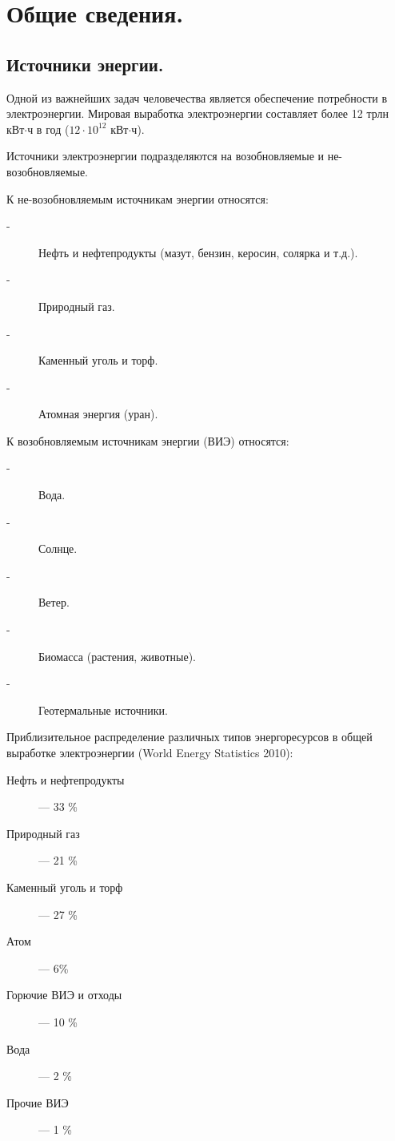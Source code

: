 \newtheorem{primer}{Пример}

\section {Общие сведения.}			%

\subsection {Источники энергии.}

Одной из важнейших задач человечества является обеспечение потребности в электроэнергии. Мировая выработка электроэнергии составляет более 12 трлн кВт$\cdot$ч в год ($12 \cdot 10^{12}$ кВт$\cdot$ч).

Источники электроэнергии подразделяются на возобновляемые и не-возобновляемые.

К не-возобновляемым источникам энергии относятся:
\begin{description}
\item[-] Нефть и нефтепродукты (мазут, бензин, керосин, солярка и т.д.).
\item[-] Природный газ.
\item[-] Каменный уголь и торф.
\item[-] Атомная энергия (уран).
\end{description}

К возобновляемым источникам энергии (ВИЭ) относятся:
\begin{description}
\item[-] Вода.
\item[-] Солнце.
\item[-] Ветер.
\item[-] Биомасса (растения, животные).
\item[-] Геотермальные источники.
\end{description}

\vspace{0.5cm}

Приблизительное распределение различных типов энергоресурсов в общей выработке электроэнергии (World Energy Statistics 2010):
\begin{description}
\item[Нефть и нефтепродукты] --- 33 \%
\item[Природный газ] --- 21 \%
\item[Каменный уголь и торф] --- 27 \%
\item[Атом] --- 6\%
\item[Горючие ВИЭ и отходы] --- 10 \%
\item[Вода] --- 2 \%
\item[Прочие ВИЭ] --- 1 \%
\end{description}

